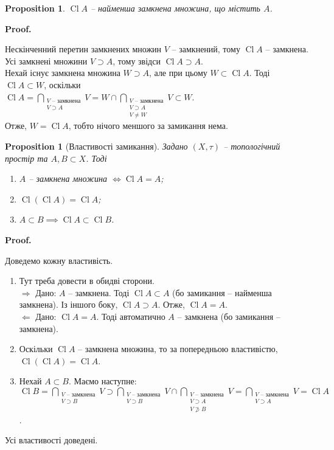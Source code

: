 \documentclass[a4paper, 10pt]{article}
\makeatletter
\def\rightproof{$\boxed{\Rightarrow}$ }
\def\leftproof{$\boxed{\Leftarrow}$ }
\theoremstyle{theoremdd}
\newtheorem{proposition}[theorem]{Proposition}
\DeclareMathOperator{\Cl}{Cl}
\renewenvironment{proof}[1][Proof.\\]{\par
\pushQED{\hfill \qed}%
\normalfont \topsep6\p@\@plus6\p@\relax
\trivlist
\item\relax
{\bfseries
#1\@addpunct{.}}\hspace\labelsep\ignorespaces
}{%
\popQED\endtrivlist\@endpefalse
}
\makeatother
\begin{document}
\begin{proposition}
$\Cl A$ -- найменша замкнена множина, що містить $A$.
\end{proposition}

\begin{proof}
Нескінченний перетин замкнених множин $V$ -- замкнений, тому $\Cl A$ -- замкнена.\\
Усі замкнені множини $V \supset A$, тому звідси $\Cl A \supset A$.\\
Нехай існує замкнена множина $W \supset A$, але при цьому $W \subset \Cl A$. Тоді $\Cl A \subset W$, оскільки\\
$\Cl A = \displaystyle\bigcap_{\substack{\text{$V$ -- замкнена} \\ V \supset A}} V = W \cap \bigcap_{\substack{\text{$V$ -- замкнена} \\ V \supset A \\ V \neq W}} V \subset W$.\\
Отже, $W = \Cl A$, тобто нічого меншого за замикання нема.
\end{proof}

\begin{proposition}[Властивості замикання]
Задано $(X,\tau)$ -- топологічний простір та $A,B \subset X$. Тоді
\begin{enumerate}[nosep,wide=0pt,label={\arabic*)}]
\item $A$ -- замкнена множина $\iff \Cl A = A$;
\item $\Cl(\Cl A) = \Cl A$;
\item $A \subset B \implies \Cl A \subset \Cl B$.
\end{enumerate}
\end{proposition}

\begin{proof}
Доведемо кожну властивість.
\begin{enumerate}[wide=0pt,label={\arabic*)}]
\item Тут треба довести в обидві сторони.\\
\rightproof Дано: $A$ -- замкнена. Тоді $\Cl A \subset A$ (бо замикання -- найменша замкнена). Із іншого боку, $\Cl A \supset A$. Отже, $\Cl A = A$.\\
\leftproof Дано: $\Cl A = A$. Тоді автоматично $A$ -- замкнена (бо замикання -- замкнена).
\item Оскільки $\Cl A$ -- замкнена множина, то за попередньою властивістю, $\Cl (\Cl A) = \Cl A$.
\item Нехай $A \subset B$. Маємо наступне:\\
$\Cl B = \displaystyle\bigcap_{\substack{\text{$V$ -- замкнена} \\ V \supset B}} V \supset \bigcap_{\substack{\text{$V$ -- замкнена} \\ V \supset B}} V \cap \bigcap_{\substack{\text{$V$ -- замкнена} \\ V \supset A \\ V \not\supset B}} V = \bigcap_{\substack{\text{$V$ -- замкнена} \\ V \supset A}} V = \Cl A$.
\end{enumerate}
Усі властивості доведені.
\end{proof}
\end{document}
